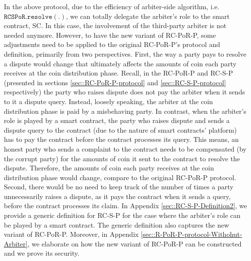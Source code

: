 In the above protocol, due to the efficiency of arbiter-side algorithm, i.e. $\mathtt{RCSPoR.resolve}(.)$,  we can  totally delegate the arbiter’s role to the smart contract, SC. In this case, the involvement of the third-party arbiter is not needed anymore.  However, to have the new variant of RC-PoR-P,   some adjustments need to be applied to the original RC-PoR-P’s protocol and definition, primarily from  two  perspectives. First,    the way a party pays to resolve a dispute would change that ultimately affects the amounts of coin each party receives at the coin distribution phase. Recall, in the RC-PoR-P and RC-S-P (presented in sections \ref{sec::RC-PoR-P-protocol} and \ref{sec::RC-S-P-protocol} respectively)  the party who raises dispute does not pay the arbiter when it sends to it a dispute query. Instead, loosely speaking, the arbiter at the coin distribution phase is paid by a misbehaving party. In contrast, when the arbiter’s role is played by a smart contract, the party who raises dispute and sends a dispute query to the contract (due to the nature of smart contracts' platform) has to pay the contract before the contract processes its query. This means, an honest party who sends a complaint to the contract needs to be compensated (by the corrupt party) for the amounts  of coin it sent to the contract to resolve the dispute. Therefore, the amounts of coin each party receives at the coin distribution phase would change, compare to the original RC-PoR-P protocol. Second, there would be no need to keep track of the number of times a party unnecessarily raises a dispute, as it pays the contract when it sends a query, before the contract processes its claim. In Appendix \ref{sec::RC-S-P-Definition2}, we provide a generic definition for RC-S-P for the case where the arbiter's role can be played by a smart contract. The generic definition also captures the new variant of RC-PoR-P. Moreover, in Appendix \ref{sec::R-PoR-P-protocol-Withohut-Arbiter}, we elaborate on how  the new variant of RC-PoR-P can be constructed and we prove its security.  

 
% 



%



